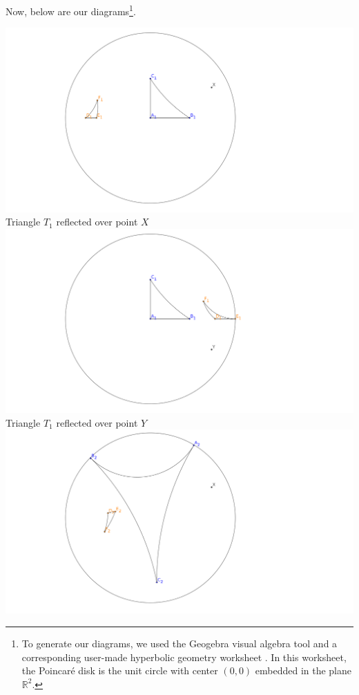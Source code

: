 \documentclass[12pt]{article}
\newcommand{\R}{\mathbb{R}}
\newcommand{\poincare}{Poincar\'{e} }
\theoremstyle{plain}
\theoremstyle{definition}
\begin{document}
Now, below are our diagrams\footnote{To generate our diagrams, we used the Geogebra visual algebra tool \cite{geogebra_software} and a corresponding user-made hyperbolic geometry worksheet \cite{hyperbolic_worksheet}. In this worksheet, the \poincare disk is the unit circle with center $(0,0)$ embedded in the plane $\R^2$.}.

\iffalse
\begin{center}
\includegraphics[width=160mm]{../images/t1_over_x.png} \\
Triangle $T_1$ reflected over point $X$ 
\[\]
\includegraphics[width=160mm]{../images/t1_over_y.png} \\
Triangle $T_1$ reflected over point $Y$  
\[\]
\includegraphics[width=160mm]{../images/t2_over_x.png} \\

\end{center}
\end{document}
